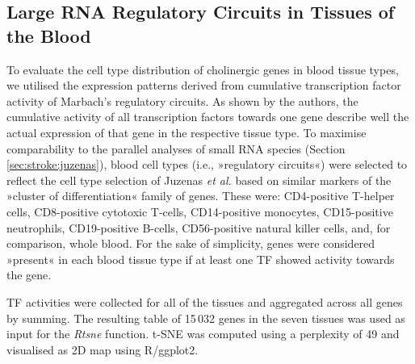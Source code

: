 \begin{method}

\subsection{Large RNA Regulatory Circuits in Tissues of the Blood}
To evaluate the cell type distribution of cholinergic genes in blood tissue types, we utilised the expression patterns derived from cumulative transcription factor activity of Marbach's regulatory circuits.\cite{Marbach2016} As shown by the authors, the cumulative activity of all transcription factors towards one gene describe well the actual expression of that gene in the respective tissue type. To maximise comparability to the parallel analyses of small RNA species (Section \ref{sec:stroke:juzenas}), blood cell types (i.e., »regulatory circuits«) were selected to reflect the cell type selection of Juzenas \emph{et al.}\cite{Juzenas2017} based on similar markers of the »cluster of differentiation« family of genes. These were: CD4-positive T-helper cells, CD8-positive cytotoxic T-cells, CD14-positive monocytes, CD15-positive neutrophils, CD19-positive B-cells, CD56-positive natural killer cells, and, for comparison, whole blood. For the sake of simplicity, genes were considered »present« in each blood tissue type if at least one TF showed activity towards the gene.

TF activities were collected for all of the tissues and aggregated across all genes by summing. The resulting table of 15\,032 genes in the seven tissues was used as input for the \emph{Rtsne} function.\cite{Krijthe2015} t-SNE was computed using a perplexity of 49 and visualised as 2D map using R/ggplot2.\cite{Wickham2016}


\end{method}
